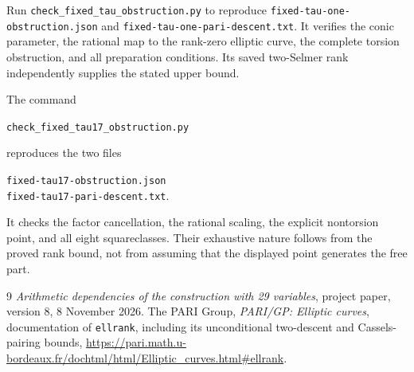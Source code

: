 \documentclass[11pt,a4paper]{article}
\theoremstyle{definition}\newtheorem{definition}[theorem]{Definition}
\begin{document}
Run \nolinkurl{check_fixed_tau_obstruction.py} to reproduce
\nolinkurl{fixed-tau-one-obstruction.json} and
\nolinkurl{fixed-tau-one-pari-descent.txt}. It verifies the conic
parameter, the rational map to the rank-zero elliptic curve, the
complete torsion obstruction, and all preparation conditions. Its
saved two-Selmer rank independently supplies the stated upper bound.

The command
\begin{center}\small
\nolinkurl{check_fixed_tau17_obstruction.py}
\end{center}
reproduces the two files
\begin{center}\small
\nolinkurl{fixed-tau17-obstruction.json}\\
\nolinkurl{fixed-tau17-pari-descent.txt}.
\end{center}
It checks the factor
cancellation, the rational scaling, the explicit nontorsion point,
and all eight squareclasses. Their exhaustive nature follows from
the proved rank bound, not from assuming that the displayed point
generates the free part.

\begin{thebibliography}{9}\small
{}
\emph{Arithmetic dependencies of the construction with 29 variables},
project paper, version 8, 8 November 2026.
The PARI Group, \emph{PARI/GP: Elliptic curves}, documentation of
\texttt{ellrank}, including its unconditional two-descent and
Cassels-pairing bounds,
\url{https://pari.math.u-bordeaux.fr/dochtml/html/Elliptic_curves.html\#ellrank}.
\end{thebibliography}
\end{document}
